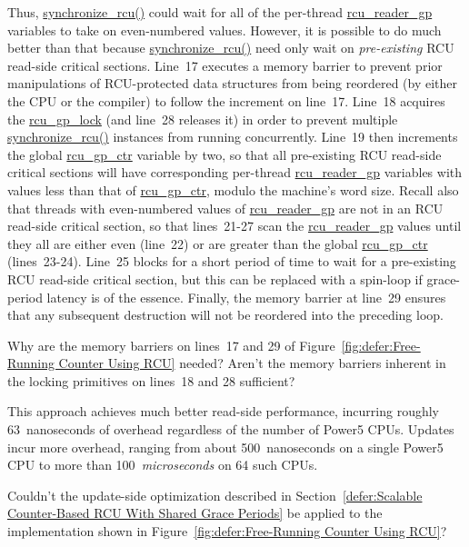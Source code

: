 Thus, \url{synchronize_rcu()} could wait for all of the per-thread
\url{rcu_reader_gp} variables to take on even-numbered values.
However, it is possible to do much better than that because
\url{synchronize_rcu()} need only wait on \emph{pre-existing}
RCU read-side critical sections.
Line~17 executes a memory barrier to prevent prior manipulations
of RCU-protected data structures from being reordered (by either
the CPU or the compiler) to follow the increment on line~17.
Line~18 acquires the \url{rcu_gp_lock} (and line~28 releases it)
in order to prevent multiple
\url{synchronize_rcu()} instances from running concurrently.
Line~19 then increments the global \url{rcu_gp_ctr} variable by
two, so that all pre-existing RCU read-side critical sections will
have corresponding per-thread \url{rcu_reader_gp} variables with
values less than that of \url{rcu_gp_ctr}, modulo the machine's
word size.
Recall also that threads with even-numbered values of \url{rcu_reader_gp}
are not in an RCU read-side critical section,
so that lines~21-27 scan the \url{rcu_reader_gp} values until they
all are either even (line~22) or are greater than the global
\url{rcu_gp_ctr} (lines~23-24).
Line~25 blocks for a short period of time to wait for a
pre-existing RCU read-side critical section, but this can be replaced with
a spin-loop if grace-period latency is of the essence.
Finally, the memory barrier at line~29 ensures that any subsequent
destruction will not be reordered into the preceding loop.

\QuickQuiz{}
	Why are the memory barriers on lines~17 and 29 of
	Figure~\ref{fig:defer:Free-Running Counter Using RCU}
	needed?
	Aren't the memory barriers inherent in the locking
	primitives on lines~18 and 28 sufficient?
 \QuickQuizEnd

This approach achieves much better read-side performance, incurring
roughly 63~nanoseconds of overhead regardless of the number of
Power5 CPUs.
Updates incur more overhead, ranging from about 500~nanoseconds on
a single Power5 CPU to more than 100~\emph{microseconds} on 64
such CPUs.

\QuickQuiz{}
	Couldn't the update-side optimization described in
	Section~\ref{defer:Scalable Counter-Based RCU With Shared Grace Periods}
	be applied to the implementation shown in
	Figure~\ref{fig:defer:Free-Running Counter Using RCU}?
 \QuickQuizEnd

